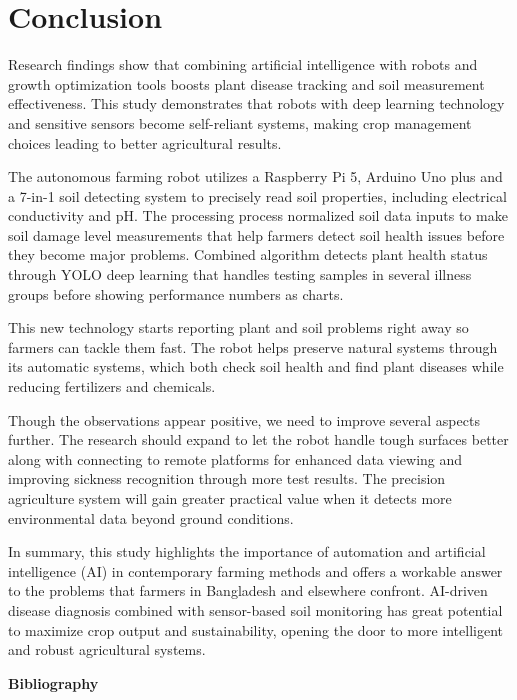 \documentclass{book} %
\begin{document}
\noindent 
\chapter{Conclusion}

\noindent Research findings show that combining artificial intelligence with robots and growth optimization tools boosts plant disease tracking and soil measurement effectiveness. This study demonstrates that robots with deep learning technology and sensitive sensors become self-reliant systems, making crop management choices leading to better agricultural results.

\noindent The autonomous farming robot utilizes a Raspberry Pi 5, Arduino Uno plus and a 7-in-1 soil detecting system to precisely read soil properties, including electrical conductivity and pH. The processing process normalized soil data inputs to make soil damage level measurements that help farmers detect soil health issues before they become major problems. Combined algorithm detects plant health status through YOLO deep learning that handles testing samples in several illness groups before showing performance numbers as charts.

\noindent This new technology starts reporting plant and soil problems right away so farmers can tackle them fast. The robot helps preserve natural systems through its automatic systems, which both check soil health and find plant diseases while reducing fertilizers and chemicals.

\noindent 

\noindent Though the observations appear positive, we need to improve several aspects further. The research should expand to let the robot handle tough surfaces better along with connecting to remote platforms for enhanced data viewing and improving sickness recognition through more test results. The precision agriculture system will gain greater practical value when it detects more environmental data beyond ground conditions.

\noindent In summary, this study highlights the importance of automation and artificial intelligence (AI) in contemporary farming methods and offers a workable answer to the problems that farmers in Bangladesh and elsewhere confront. AI-driven disease diagnosis combined with sensor-based soil monitoring has great potential to maximize crop output and sustainability, opening the door to more intelligent and robust agricultural systems.\eject 

\noindent \textbf{Bibliography}
\end{document}
